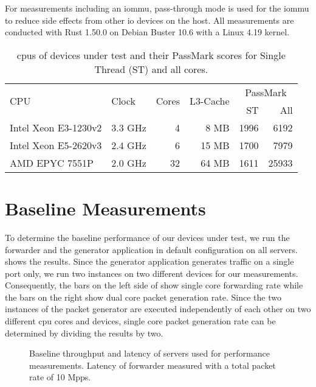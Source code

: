 For measurements including an \ac{iommu}, pass-through mode is used for the
\ac{iommu} to reduce side effects from other \ac{io} devices on the host. All
measurements are conducted with Rust 1.50.0 on Debian Buster 10.6 with a Linux
4.19 kernel.

\begin{table}
    \centering
    \begin{tabular}{l|l|r|r|r|r}
        \multirow{2}{*}{CPU} & \multirow{2}{*}{Clock} & \multirow{2}{*}{Cores} &
        \multirow{2}{*}{L3-Cache} & \multicolumn{2}{c}{PassMark} \\
        & & & & ST & All \\ \hline

        Intel Xeon E3-1230v2 & 3.3 GHz &  4 &  8 MB & 1996 &  6192 \\ \hline
        Intel Xeon E5-2620v3 & 2.4 GHz &  6 & 15 MB & 1700 &  7979 \\ \hline
        AMD EPYC 7551P       & 2.0 GHz & 32 & 64 MB & 1611 & 25933 \\
    \end{tabular}

    \caption{\acsp{cpu} of devices under test and their PassMark scores for
    Single Thread (ST) and all cores.}
    \label{tab:cpus}
\end{table}


\section{Baseline Measurements}
\label{sec:baseline_measurements}

To determine the baseline performance of our devices under test, we run the
forwarder and the generator application in default configuration on all servers.
 shows the results. Since the generator application
generates traffic on a single port only, we run two instances on two different
devices for our measurements. Consequently, the bars on the left side of
 show single core forwarding rate while the
bars on the right show dual core packet generation rate. Since the two instances
of the packet generator are executed independently of each other on two
different \ac{cpu} cores and devices, single core packet generation rate can be
determined by dividing the results by two.

\begin{figure}%
	\centering

    \caption{Baseline throughput and latency of servers used for performance
    measurements. Latency of forwarder measured with a total packet rate of 10
    Mpps.}
	\label{fig:baseline-perf}
\end{figure}

